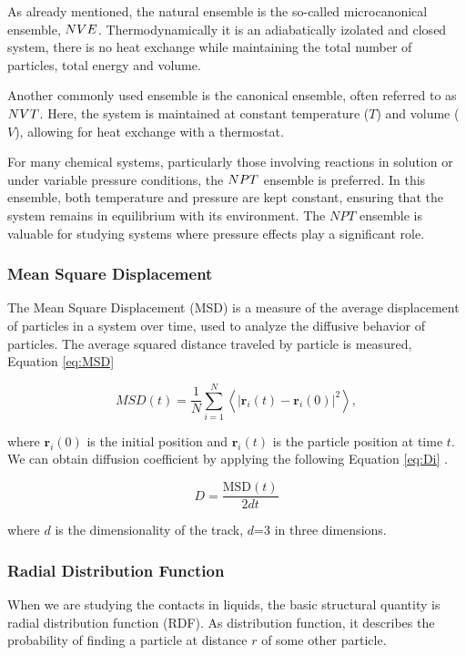 As already mentioned, the natural ensemble is the so-called microcanonical ensemble, $\boldmath{NVE}$. Thermodynamically it is an adiabatically izolated and closed system, there is no heat exchange while maintaining the total number of particles, total energy and volume. 

Another commonly used ensemble is the canonical ensemble, often referred to as $\boldmath{NVT}$. Here, the system is maintained at constant temperature ($T$) and volume ($V$), allowing for heat exchange with a thermostat.

For many chemical systems, particularly those involving reactions in solution or under variable pressure conditions, the $\boldmath{NPT}$ ensemble is preferred. In this ensemble, both temperature and pressure are kept constant, ensuring that the system remains in equilibrium with its environment. The $NPT$ ensemble is valuable for studying systems where pressure effects play a significant role.


\subsubsection{Mean Square Displacement}
The Mean Square Displacement (MSD) is a measure of the average displacement of particles in a system over time, used to analyze the diffusive behavior of particles. The average squared distance traveled by particle is measured, Equation \ref{eq:MSD}

\begin{equation}\label{eq:MSD}
MSD(t) = \frac{1}{N} \sum_{i=1}^{N} \left\langle \left| \mathbf{r}_i(t) - \mathbf{r}_i(0) \right|^2 \right\rangle,
\end{equation}

where $\mathbf{r}_i(0)$ is the initial position and $\mathbf{r}_i(t)$ is the particle position at time $t$. We can obtain diffusion coefficient by applying the following Equation \ref{eq:Di} \cite{braun_best_2019}. 

\begin{equation}\label{eq:Di}
	D = \frac{\text{MSD}(t)}{2dt}
\end{equation}

where $d$ is the dimensionality of the track, $d$=3 in three dimensions.

\subsubsection{Radial Distribution Function}
When we are studying the contacts in liquids, the basic structural quantity is radial distribution function (RDF). As distribution function, it describes the probability of finding a particle at distance $r$ of some other particle. \cite{mdskripta} 

